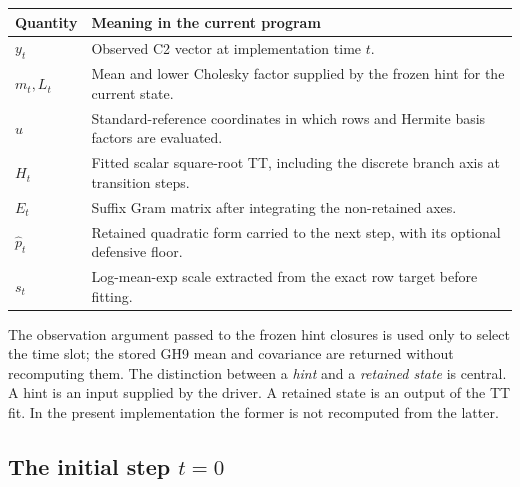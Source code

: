 \documentclass[11pt]{article}
\begin{document}
\begin{center}
\begin{tabular}{p{}p{}}
\toprule
Quantity & Meaning in the current program\\
\midrule
$y_t$ & Observed C2 vector at implementation time $t$.\\
$m_t,L_t$ & Mean and lower Cholesky factor supplied by the frozen hint for the current state.\\
$u$ & Standard-reference coordinates in which rows and Hermite basis factors are evaluated.\\
$H_t$ & Fitted scalar square-root TT, including the discrete branch axis at transition steps.\\
$E_t$ & Suffix Gram matrix after integrating the non-retained axes.\\
$\widehat p_t$ & Retained quadratic form carried to the next step, with its optional defensive floor.\\
$s_t$ & Log-mean-exp scale extracted from the exact row target before fitting.\\
\bottomrule
\end{tabular}
\end{center}

The observation argument passed to the frozen hint closures is used only to
select the time slot; the stored GH9 mean and covariance are returned without
recomputing them.  The distinction between a \emph{hint} and a \emph{retained state} is central.
A hint is an input supplied by the driver.  A retained state is an output of
the TT fit.  In the present implementation the former is not recomputed from
the latter.

\subsection{The initial step $t=0$}
\end{document}
